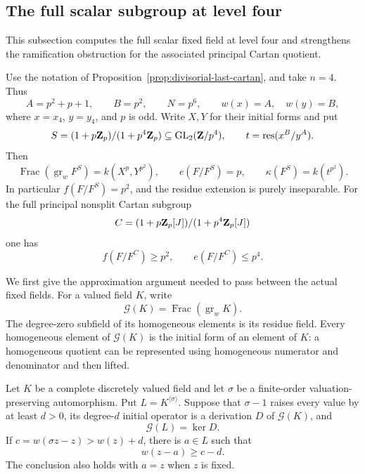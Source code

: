 \subsection{The full scalar subgroup at level four}\label{sec:divisorial-scalar}
This subsection computes the full scalar fixed field at level four and strengthens the ramification obstruction for the associated principal Cartan quotient.

\begin{proposition}\label{prop:divisorial-scalar-level-four}
Use the notation of Proposition~\ref{prop:divisorial-last-cartan}, and take $n=4$. Thus
\[
 A=p^2+p+1,\qquad B=p^2,\qquad N=p^6,
 \qquad w(x)=A,\quad w(y)=B,
\]
where $x=x_4$, $y=y_4$, and $p$ is odd. Write $X,Y$ for their initial forms and put
\[
 S=(1+p\mathbf Z_p)/(1+p^4\mathbf Z_p)\subseteq\operatorname{GL}_2(\mathbf Z/p^4),
 \qquad t=\operatorname{res}(x^B/y^A).
\]
Then
\begin{equation}\label{eq:divisorial-scalar-graded}
 \operatorname{Frac}(\operatorname{gr}_w F^S)
       =k(X^p,Y^{p^2}),
 \qquad e(F/F^S)=p,
 \qquad \kappa(F^S)=k(t^{p^2}).
\end{equation}
In particular $f(F/F^S)=p^2$, and the residue extension is purely inseparable. For the full principal nonsplit Cartan subgroup
\[
 C=(1+p\mathbf Z_p[J])/(1+p^4\mathbf Z_p[J])
\]
one has
\begin{equation}\label{eq:divisorial-cartan-scalar-bound}
 f(F/F^C)\ge p^2,\qquad e(F/F^C)\le p^4.
\end{equation}
\end{proposition}

We first give the approximation argument needed to pass between the actual fixed fields. For a valued field $K$, write
\[
 \mathcal G(K)=\operatorname{Frac}(\operatorname{gr}_w K).
\]
The degree-zero subfield of its homogeneous elements is its residue field. Every homogeneous element of $\mathcal G(K)$ is the initial form of an element of $K$: a homogeneous quotient can be represented using homogeneous numerator and denominator and then lifted.

\begin{lemma}\label{lem:divisorial-controlled-lift}
Let $K$ be a complete discretely valued field and let $\sigma$ be a finite-order valuation-preserving automorphism. Put $L=K^{\langle\sigma\rangle}$. Suppose that $\sigma-1$ raises every value by at least $d>0$, its degree-$d$ initial operator is a derivation $D$ of $\mathcal G(K)$, and
\[
 \mathcal G(L)=\ker D.
\]
If $c=w(\sigma z-z)>w(z)+d$, there is $a\in L$ such that
\[
 w(z-a)\ge c-d.
\]
The conclusion also holds with $a=z$ when $z$ is fixed.
\end{lemma}

